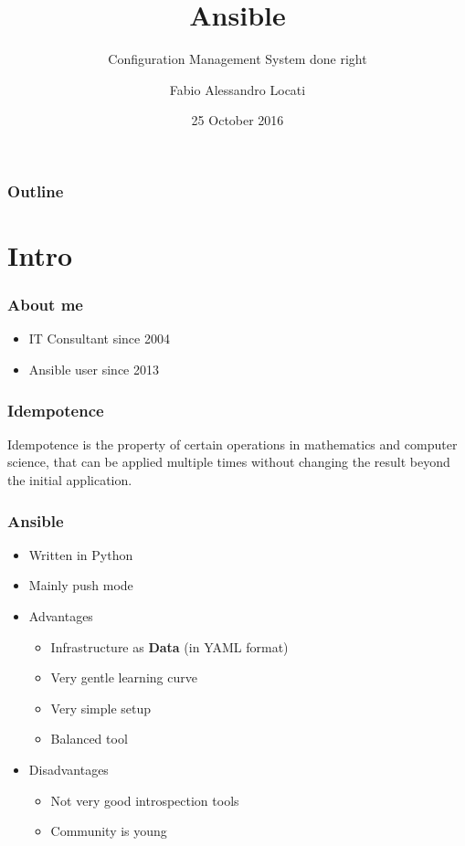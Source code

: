 \documentclass[t,aspectratio=169]{beamer}
\title{Ansible}
\subtitle{Configuration Management System done right}
\author{Fabio Alessandro Locati}
\date{25 October 2016}
\begin{document}
\maketitle

\begin{frame}
    \frametitle{Outline}
    \tableofcontents
\end{frame}

\section{Intro}
\begin{frame}
    \frametitle{About me}
    \begin{itemize}
        \item<2-> IT Consultant since 2004
        \item<3-> Ansible user since 2013
    \end{itemize}
\end{frame}

\begin{frame}
    \frametitle{Idempotence}
    \begin{definition}{Idempotence}
    is the property of certain operations in mathematics and computer science, that can be applied multiple times without changing the result beyond the initial application. 
    \end{definition}
\end{frame}

\begin{frame}
    \frametitle{Ansible}
    \begin{itemize}
        \item<2-> Written in Python
        \item<3-> Mainly push mode
        \item<4-> Advantages
        \begin{itemize}
            \item<5-> Infrastructure as \textbf{Data} (in YAML format)
            \item<6-> Very gentle learning curve
            \item<7-> Very simple setup
            \item<8-> Balanced tool
        \end{itemize}
        \item<9-> Disadvantages
        \begin{itemize}
            \item<10-> Not very good introspection tools
            \item<11-> Community is young
        \end{itemize}
    \end{itemize}
\end{frame}
\end{document}
